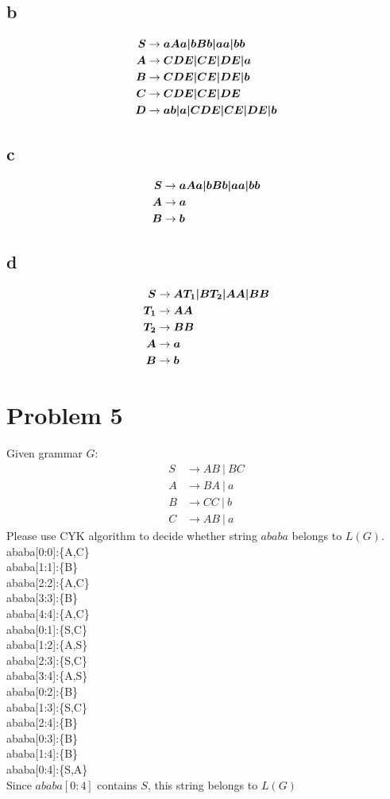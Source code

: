 \documentclass[a4paper,UTF8]{ctexart}
\theoremstyle{definition}
\begin{document}
\subsection*{b}

\begin{alignat*}{2}
  \boldsymbol{S} &\rightarrow \boldsymbol{aAa|bBb|aa|bb}\\
  \boldsymbol{A} &\rightarrow \boldsymbol{CDE|CE|DE|a}\\
  \boldsymbol{B} &\rightarrow \boldsymbol{CDE|CE|DE|b}\\
  \boldsymbol{C} &\rightarrow \boldsymbol{CDE|CE|DE}\\
  \boldsymbol{D} &\rightarrow \boldsymbol{ab|a|CDE|CE|DE|b}
\end{alignat*}

\subsection*{c}
\begin{alignat*}{2}
  \boldsymbol{S} &\rightarrow \boldsymbol{aAa|bBb|aa|bb}\\
  \boldsymbol{A} &\rightarrow \boldsymbol{a}\\
  \boldsymbol{B} &\rightarrow \boldsymbol{b}\\
\end{alignat*}

\subsection*{d}
\begin{alignat*}{2}
  \boldsymbol{S} &\rightarrow \boldsymbol{AT_1|BT_2|AA|BB}\\
  \boldsymbol{T_1} &\rightarrow \boldsymbol{AA}\\
  \boldsymbol{T_2} &\rightarrow \boldsymbol{BB}\\  
  \boldsymbol{A} &\rightarrow \boldsymbol{a}\\
  \boldsymbol{B} &\rightarrow \boldsymbol{b}\\
\end{alignat*}

\section*{Problem 5}
Given grammar $G$:
\[
	\begin{aligned}
		S & \rightarrow AB\ |\ BC \\
		A & \rightarrow BA\ |\ a  \\
		B & \rightarrow CC\ |\ b  \\
		C & \rightarrow AB\ |\ a
	\end{aligned}
\]
Please use CYK algorithm to decide whether string $ababa$ belongs to $L(G)$.
\newcommand{\cyk}[3]{ababa[#1:#2]:\{#3\}\\}\\
\cyk{0}{0}{A,C}
\cyk{1}{1}{B}
\cyk{2}{2}{A,C}
\cyk{3}{3}{B}
\cyk{4}{4}{A,C}
\cyk{0}{1}{S,C}
\cyk{1}{2}{A,S}
\cyk{2}{3}{S,C}
\cyk{3}{4}{A,S}
\cyk{0}{2}{B}
\cyk{1}{3}{S,C}
\cyk{2}{4}{B}
\cyk{0}{3}{B}
\cyk{1}{4}{B}
\cyk{0}{4}{S,A}
Since $ababa[0:4]$ contains $S$, this string belongs to $L(G)$
\end{document}
